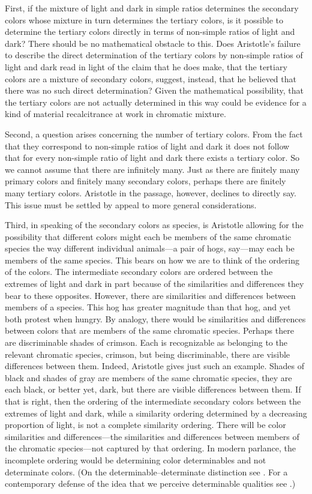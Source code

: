 First, if the mixture of light and dark in simple ratios determines the secondary colors whose mixture in turn determines the tertiary colors, is it possible to determine the tertiary colors directly in terms of non-simple ratios of light and dark? There should be no mathematical obstacle to this. Does Aristotle's failure to describe the direct determination of the tertiary colors by non-simple ratios of light and dark read in light of the claim that he does make, that the tertiary colors are a mixture of secondary colors, suggest, instead, that he believed that there was no such direct determination? Given the mathematical possibility, that the tertiary colors are not actually determined in this way could be evidence for a kind of material recalcitrance at work in chromatic mixture.

Second, a question arises concerning the number of tertiary colors. From the fact that they correspond to non-simple ratios of light and dark it does not follow that for every non-simple ratio of light and dark there exists a tertiary color. So we cannot assume that there are infinitely many. Just as there are finitely many primary colors and finitely many secondary colors, perhaps there are finitely many tertiary colors. Aristotle in the passage, however, declines to directly say. This issue must be settled by appeal to more general considerations.

Third, in speaking of the secondary colors as species, is Aristotle allowing for the possibility that different colors might each be members of the same chromatic species the way different individual animals---a pair of hogs, say---may each be members of the same species. This bears on how we are to think of the ordering of the colors. The intermediate secondary colors are ordered between the extremes of light and dark in part because of the similarities and differences they bear to these opposites. However, there are similarities and differences between members of a species. This hog has greater magnitude than that hog, and yet both protest when hungry. By analogy, there would be similarities and differences between colors that are members of the same chromatic species. Perhaps there are discriminable shades of crimson. Each is recognizable as belonging to the relevant chromatic species, crimson, but being discriminable, there are visible differences between them. Indeed, Aristotle gives just such an example. Shades of black and shades of gray are members of the same chromatic species, they are each black, or better yet, dark, but there are visible differences between them.  If that is right, then the ordering of the intermediate secondary colors between the extremes of light and dark, while a similarity ordering determined by a decreasing proportion of light, is not a complete similarity ordering. There will be color similarities and differences---the similarities and differences between members of the chromatic species---not captured by that ordering. In modern parlance, the incomplete ordering would be determining color determinables and not determinate colors. (On the determinable--determinate distinction see \citealt{Johnson:1921fk}. For a contemporary defense of the idea that we perceive determinable qualities see \citealt{Allen:2010ak,Stazicker:2011an}.)

